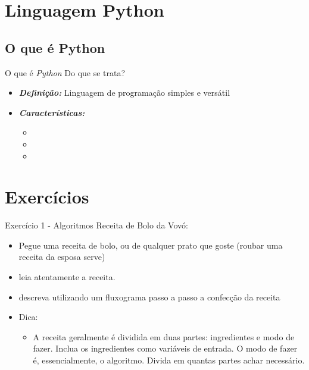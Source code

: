 \documentclass{beamer}
\begin{document}
\section{Linguagem Python}

\subsection{O que é Python}


\begin{frame}{O que é \textit{Python}}
	Do que se trata?
	\begin{itemize}
		\item \textbf{\textit{Definição:}} Linguagem de programação simples e versátil
		\item \textbf{\textit{Características:}}
		\begin{itemize}
			\item 
			\item
			\item 
		\end{itemize}
	\end{itemize}
\end{frame}


\section{Exercícios}

\begin{frame}{Exercício 1 - Algoritmos}
Receita de Bolo da Vovó:
	\begin{itemize}
		\item Pegue uma receita de bolo, ou de qualquer prato que goste (roubar uma receita da esposa serve)
		\item leia atentamente a receita.
		\item descreva utilizando um fluxograma passo a passo a confecção da receita
		\item Dica:
		\begin{itemize}
			\item A receita geralmente é dividida em duas partes: ingredientes e modo de fazer. Inclua os ingredientes como variáveis de entrada. O modo de fazer é, essencialmente, o algoritmo. Divida em quantas partes achar necessário.
		\end{itemize}
	\end{itemize}
\end{frame}
\end{document}

